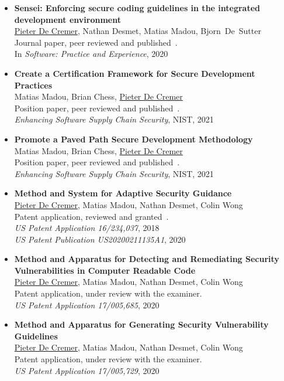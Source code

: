 \begin{itemize}
    \item 
    \textbf{Sensei: Enforcing secure coding guidelines in the integrated development environment}\\
    {\small \underline{Pieter De Cremer}, Nathan Desmet, Matias Madou, \mbox{Bjorn De Sutter}\\}
    Journal paper, peer reviewed and published~\cite{de2020sensei}.\\
    In \emph{Software: Practice and Experience}, 2020
    
    \item 
    \textbf{Create a Certification Framework for Secure Development Practices}\\
    Matias Madou, Brian Chess, \underline{Pieter De Cremer}\\
    Position paper, peer reviewed and published~\cite{nist-enhancing}.\\
    \emph{Enhancing Software Supply Chain Security}, NIST, 2021
    
    \item 
    \textbf{Promote a Paved Path Secure Development Methodology}\\
    Matias Madou, Brian Chess, \underline{Pieter De Cremer}\\
    Position paper, peer reviewed and published~\cite{nist-enhancing}.\\
    \emph{Enhancing Software Supply Chain Security}, NIST, 2021
    
    \item 
    \textbf{Method and System for Adaptive Security Guidance}\\
    \underline{Pieter De Cremer}, Matias Madou, Nathan Desmet, Colin Wong\\
    Patent application, reviewed and granted~\cite{patent-publication}.\\
    \emph{US Patent Application 16/234,037}, 2018\\
    \emph{US Patent Publication US20200211135A1}, 2020
       
    \item 
    \textbf{Method and Apparatus for Detecting and Remediating Security Vulnerabilities in Computer Readable Code}\\
    \underline{Pieter De Cremer}, Matias Madou, Nathan Desmet, Colin Wong\\
    Patent application, under review with the examiner.\\
    \emph{US Patent Application 17/005,685}, 2020
    
    \item 
    \textbf{Method and Apparatus for Generating Security Vulnerability Guidelines}\\
    \underline{Pieter De Cremer}, Matias Madou, Nathan Desmet, Colin Wong\\
    Patent application, under review with the examiner.\\
    \emph{US Patent Application 17/005,729}, 2020
    
    \end{itemize}


